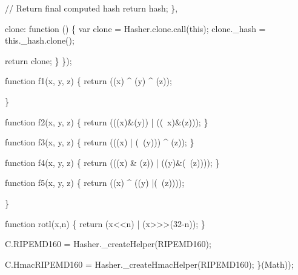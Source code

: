\begin{DoxyCodeInclude}
            \textcolor{comment}{// Return final computed hash}
            \textcolor{keywordflow}{return} hash;
        \},

        clone: \textcolor{keyword}{function} () \{
            var clone = Hasher.clone.call(\textcolor{keyword}{this});
            clone.\_hash = this.\_hash.clone();

            \textcolor{keywordflow}{return} clone;
        \}
    \});


    \textcolor{keyword}{function} f1(x, y, z) \{
        \textcolor{keywordflow}{return} ((x) ^ (y) ^ (z));

    \}

    \textcolor{keyword}{function} f2(x, y, z) \{
        \textcolor{keywordflow}{return} (((x)&(y)) | ((~x)&(z)));
    \}

    \textcolor{keyword}{function} f3(x, y, z) \{
        \textcolor{keywordflow}{return} (((x) | (~(y))) ^ (z));
    \}

    \textcolor{keyword}{function} f4(x, y, z) \{
        \textcolor{keywordflow}{return} (((x) & (z)) | ((y)&(~(z))));
    \}

    \textcolor{keyword}{function} f5(x, y, z) \{
        \textcolor{keywordflow}{return} ((x) ^ ((y) |(~(z))));

    \}

    \textcolor{keyword}{function} rotl(x,n) \{
        \textcolor{keywordflow}{return} (x<<n) | (x>>>(32-n));
    \}


    C.RIPEMD160 = Hasher.\_createHelper(RIPEMD160);

    C.HmacRIPEMD160 = Hasher.\_createHmacHelper(RIPEMD160);
\}(Math));
\end{DoxyCodeInclude}
 